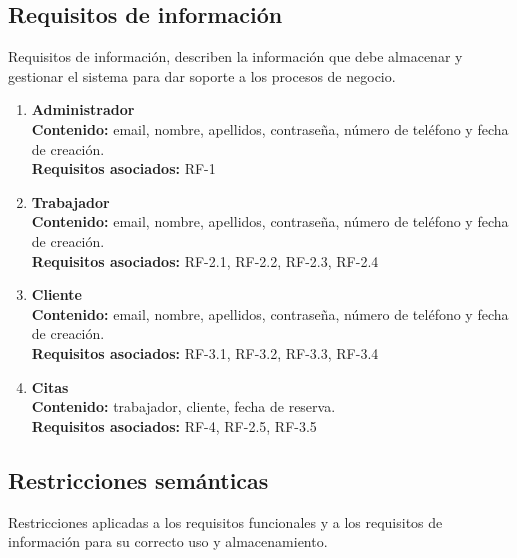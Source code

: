 \subsection{Requisitos de información}

Requisitos de información, describen la información que debe almacenar y gestionar el sistema para dar soporte a los
procesos de negocio.

\begin{enumerate}[leftmargin=1.6cm,start=1,label={\bfseries RI-\arabic*.}]
\setlength\itemsep{1em} %
    \item \textbf{Administrador}
    \\\textbf{Contenido:} email, nombre, apellidos, contraseña, número de teléfono y fecha de creación.
	\\\textbf{Requisitos asociados:} RF-1

	\item \textbf{Trabajador}
    \\\textbf{Contenido:} email, nombre, apellidos, contraseña, número de teléfono y fecha de creación.
    \\\textbf{Requisitos asociados:} RF-2.1, RF-2.2, RF-2.3, RF-2.4

    \item \textbf{Cliente}
    \\\textbf{Contenido:} email, nombre, apellidos, contraseña, número de teléfono y fecha de creación.
    \\\textbf{Requisitos asociados:} RF-3.1, RF-3.2, RF-3.3, RF-3.4

    \item \textbf{Citas}
    \\\textbf{Contenido:} trabajador, cliente, fecha de reserva.
    \\\textbf{Requisitos asociados:} RF-4, RF-2.5, RF-3.5\\
\end{enumerate}

\subsection{Restricciones semánticas}

Restricciones aplicadas a los requisitos funcionales y a los requisitos de información
para su correcto uso y almacenamiento.

